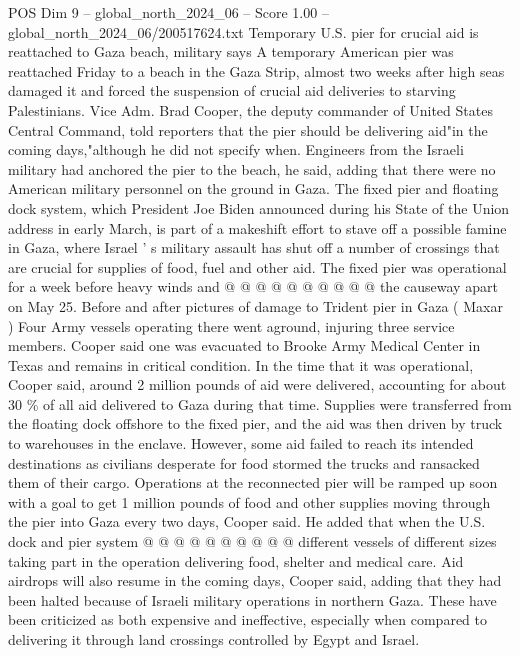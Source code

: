 \begin{textsample}{POS Dim 9 – global\_north\_2024\_06 – Score 1.00 – global\_north\_2024\_06/200517624.txt}  \label{ex:f9_pos_282}
Temporary U.S. pier for crucial aid is reattached to Gaza beach, military says A temporary American pier was reattached Friday to a beach in the Gaza Strip, almost two weeks after high seas damaged it and forced the suspension of crucial aid deliveries to starving Palestinians.
Vice Adm.
Brad Cooper, the deputy commander of United States Central Command, told reporters that the pier should be delivering aid"in the coming days,"although he did not specify when.
Engineers from the Israeli military had anchored the pier to the beach, he said, adding that there were no American military personnel on the ground in Gaza.
The fixed pier and floating dock system, which President Joe Biden announced during his State of the Union address in early March, is part of a makeshift effort to stave off a possible famine in Gaza, where Israel ' s military assault has shut off a number of crossings that are crucial for supplies of food, fuel and other aid.
The fixed pier was operational for a week before heavy winds and @ @ @ @ @ @ @ @ @ @ the causeway apart on May 25.
Before and after pictures of damage to Trident pier in Gaza ( Maxar ) Four Army vessels operating there went aground, injuring three service members.
Cooper said one was evacuated to Brooke Army Medical Center in Texas and remains in critical condition.
In the time that it was operational, Cooper said, around 2 million pounds of aid were delivered, accounting for about 30 \% of all aid delivered to Gaza during that time.
Supplies were transferred from the floating dock offshore to the fixed pier, and the aid was then driven by truck to warehouses in the enclave.
However, some aid failed to reach its intended destinations as civilians desperate for food stormed the trucks and ransacked them of their cargo.
Operations at the reconnected pier will be ramped up soon with a goal to get 1 million pounds of food and other supplies moving through the pier into Gaza every two days, Cooper said.
He added that when the U.S. dock and pier system @ @ @ @ @ @ @ @ @ @ different vessels of different sizes taking part in the operation delivering food, shelter and medical care.
Aid airdrops will also resume in the coming days, Cooper said, adding that they had been halted because of Israeli military operations in northern Gaza.
These have been criticized as both expensive and ineffective, especially when compared to delivering it through land crossings controlled by Egypt and Israel.

\end{textsample}
